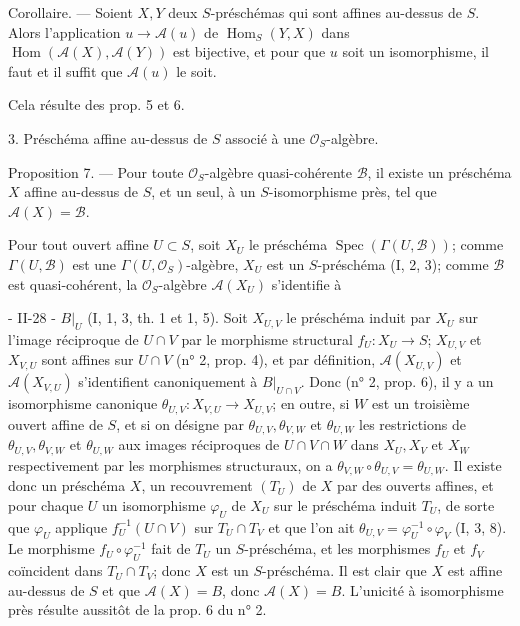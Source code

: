 Corollaire. — Soient $X, Y$ deux $S$-préschémas qui sont affines au-dessus de $S$. Alors l'application $u \to \mathcal{A}(u)$ de $\operatorname{Hom}_S(Y, X)$ dans $\operatorname{Hom}(\mathcal{A}(X), \mathcal{A}(Y))$ est bijective, et pour que $u$ soit un isomorphisme, il faut et il suffit que $\mathcal{A}(u)$ le soit.

Cela résulte des prop. 5 et 6.

3. Préschéma affine au-dessus de $S$ associé à une $\mathcal{O}_S$-algèbre.

Proposition 7. — Pour toute $\mathcal{O}_S$-algèbre quasi-cohérente $\mathcal{B}$, il existe un préschéma $X$ affine au-dessus de $S$, et un seul, à un $S$-isomorphisme près, tel que $\mathcal{A}(X) = \mathcal{B}$.

Pour tout ouvert affine $U \subset S$, soit $X_U$ le préschéma $\operatorname{Spec}(\Gamma(U, \mathcal{B}))$; comme $\Gamma(U, \mathcal{B})$ est une $\Gamma(U, \mathcal{O}_S)$-algèbre, $X_U$ est un $S$-préschéma (I, 2, 3); comme $\mathcal{B}$ est quasi-cohérent, la $\mathcal{O}_S$-algèbre $\mathcal{A}(X_U)$ s'identifie à

\newpage


- II-28 -
$B|_U$ (I, 1, 3, th. 1 et 1, 5). Soit $X_{U,V}$ le préschéma induit par $X_U$ sur l'image réciproque de $U \cap V$ par le morphisme structural $f_U : X_U \to S$; $X_{U,V}$ et $X_{V,U}$ sont affines sur $U \cap V$ (n° 2, prop. 4), et par définition, $\mathcal{A}(X_{U,V})$ et $\mathcal{A}(X_{V,U})$ s'identifient canoniquement à $B|_{U \cap V}$. Donc (n° 2, prop. 6), il y a un isomorphisme canonique $\theta_{U,V} : X_{V,U} \to X_{U,V}$; en outre, si $W$ est un troisième ouvert affine de $S$, et si on désigne par $\theta_{U,V}, \theta_{V,W}$ et $\theta_{U,W}$ les restrictions de $\theta_{U,V}, \theta_{V,W}$ et $\theta_{U,W}$ aux images réciproques de $U \cap V \cap W$ dans $X_U, X_V$ et $X_W$ respectivement par les morphismes structuraux, on a $\theta_{V,W} \circ \theta_{U,V} = \theta_{U,W}$. Il existe donc un préschéma $X$, un recouvrement $(T_U)$ de $X$ par des ouverts affines, et pour chaque $U$ un isomorphisme $\varphi_U$ de $X_U$ sur le préschéma induit $T_U$, de sorte que $\varphi_U$ applique $f_U^{-1}(U \cap V)$ sur $T_U \cap T_V$ et que l'on ait $\theta_{U,V} = \varphi_U^{-1} \circ \varphi_V$ (I, 3, 8). Le morphisme $f_U \circ \varphi_U^{-1}$ fait de $T_U$ un $S$-préschéma, et les morphismes $f_U$ et $f_V$ coïncident dans $T_U \cap T_V$; donc $X$ est un $S$-préschéma. Il est clair que $X$ est affine au-dessus de $S$ et que $\mathcal{A}(X) = B$, donc $\mathcal{A}(X) = B$. L'unicité à isomorphisme près résulte aussitôt de la prop. 6 du n° 2.

